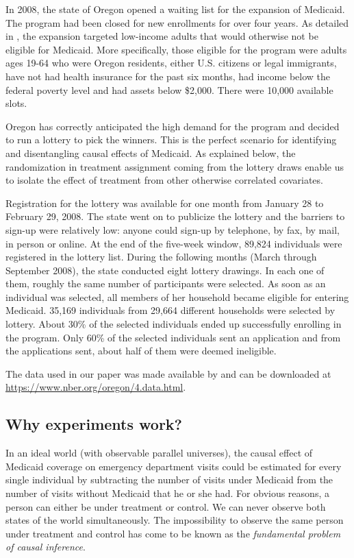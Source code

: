 In 2008, the state of Oregon opened a waiting list for the expansion of Medicaid. The program had been closed for new enrollments for over four years. As detailed in \cite{finkelsteinOregonHealthInsurance2012}, the expansion targeted low-income adults that would otherwise not be eligible for Medicaid. More specifically, those eligible for the program were adults ages 19-64 who were Oregon residents, either U.S. citizens or legal immigrants, have not had health insurance for the past six months, had income below the federal poverty level and had assets below \$2,000. There were 10,000 available slots.

Oregon has correctly anticipated the high demand for the program and decided to run a lottery to pick the winners. This is the perfect scenario for identifying and disentangling causal effects of Medicaid. As explained below, the randomization in treatment assignment coming from the lottery draws enable us to isolate the effect of treatment from other otherwise correlated covariates.

Registration for the lottery was available for one month from January 28 to February 29, 2008. The state went on to publicize the lottery and the barriers to sign-up were relatively low: anyone could sign-up by telephone, by fax, by mail, in person or online. At the end of the five-week window, 89,824 individuals were registered in the lottery list. During the following months (March through September 2008), the state conducted eight lottery drawings. In each one of them, roughly the same number of participants were selected. As soon as an individual was selected, all members of her household became eligible for entering Medicaid. 35,169 individuals from 29,664 different households were selected by lottery. About 30\% of the selected individuals ended up successfully enrolling in the program. Only 60\% of the selected individuals sent an application and from the applications sent, about half of them were deemed ineligible.

The data used in our paper was made available by \cite{finkelsteinOregonHealthInsurance2012} and can be downloaded at \url{https://www.nber.org/oregon/4.data.html}.

\subsection{Why experiments work?}

In an ideal world (with observable parallel universes), the causal effect of Medicaid coverage on emergency department visits could be estimated for every single individual by subtracting the number of visits under Medicaid from the number of visits without Medicaid that he or she had. For obvious reasons, a person can either be under treatment or control. We can never observe both states of the world simultaneously. The impossibility to observe the same person under treatment and control has come to be known as the \textit{fundamental problem of causal inference}.

